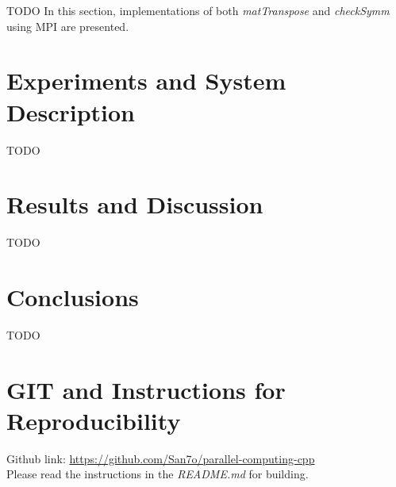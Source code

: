 \documentclass[conference]{IEEEtran}
\begin{document}
TODO
In this section, implementations of both \textit{matTranspose}
and \textit{checkSymm} using MPI are presented. 

\section{Experiments and System Description}

\iffalse
- Detailed description of the computing system and platform. \\
- Relevant specifications or configurations (e.g., libraries
and programming toolchains). \\
- Description of the experimental setup, procedures, and
methodologies used in the project. \\
- Discussion on how experiments are designed to test the hypotheses
or achieve the objectives \\
\fi

TODO

\section{Results and Discussion}

\iffalse
- Presentation of results \\
- Analysis and interpretation in context \\
- Comparison with the state-of-the-art \\
\fi

TODO

\section{Conclusions}

\iffalse
- Summary of the key findings and contributions
\fi 

TODO

\section{GIT and Instructions for Reproducibility}

Github link: \href{https://github.com/San7o/parallel-computing-cpp}{https://github.com/San7o/parallel-computing-cpp} \\
Please read the instructions in the \textit{README.md} for building.
\end{document}
